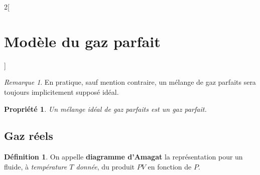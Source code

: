 \documentclass[french]{book}
\newtheorem*{propriete}{Propriété}
\theoremstyle{definition}
\newtheorem*{definition}{Définition}
\theoremstyle{remark}
\newtheorem*{remarque}{Remarque}
\newcommand*{\tdef}[1]{\textbf{#1}}
\newcommand*{\imp}[1]{\emph{#1}}
\begin{document}
\begin{landscape}
\begin{multicols*}{2}[\section{Modèle du gaz parfait}]
\begin{remarque}
En pratique, sauf mention contraire, un mélange de gaz parfaits sera toujours implicitement supposé idéal.
\end{remarque}

\begin{propriete}
Un \imp{mélange idéal de gaz parfaits} est un gaz parfait.
\end{propriete}



\subsection{Gaz réels}

\begin{definition}
On appelle \tdef{diagramme d'Amagat} la représentation pour un fluide, à \imp{température $T$ donnée}, du produit $PV$ en fonction de $P$.
\end{definition}

\end{multicols*}
\end{landscape}
\end{document}
